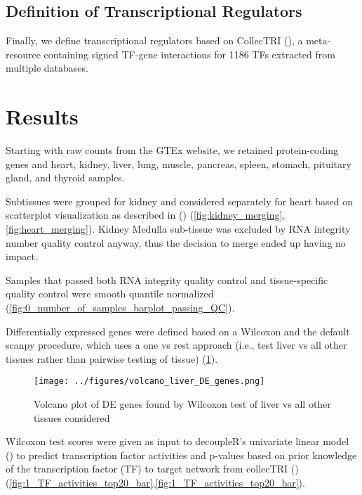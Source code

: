 \documentclass{article}
\begin{document}
\subsection{Definition of Transcriptional Regulators}

Finally, we define transcriptional regulators based on CollecTRI (\cite{Muller-Dott2023-ve}), a meta-resource containing signed TF-gene interactions for 1186 TFs extracted from multiple databases.


\section{Results}

Starting with raw counts from the GTEx website, we retained protein-coding genes and heart, kidney, liver, lung, muscle, pancreas, spleen, stomach, pituitary gland, and thyroid samples.

Subtissues were grouped for kidney and considered separately for heart based on scatterplot visualization as described in (\cite{Paulson2017-jv}) (\ref{fig:kidney_merging}, \ref{fig:heart_merging}). Kidney Medulla sub-tissue was excluded by RNA integrity number quality control anyway, thus the decision to merge ended up having no impact.

Samples that passed both RNA integrity quality control and tissue-specific quality control were smooth quantile normalized (\ref{fig:0_number_of_samples_barplot_passing_QC}).


Differentially expressed genes were defined based on a Wilcoxon and the default scanpy procedure, which uses a one vs rest approach (i.e., test liver vs all other tissues rather than pairwise testing of tissue) (\ref{fig:volcano_liver_DE_genes}). 

\begin{figure}[htbp]
  \centering
  \texttt{[image: ../figures/volcano\_liver\_DE\_genes.png]}
  \caption{Volcano plot of DE genes found by Wilcoxon test of liver vs all other tissues considered}
  \label{fig:volcano_liver_DE_genes}
\end{figure}
\FloatBarrier

Wilcoxon test scores were given as input to decoupleR's univariate linear model (\cite{Badia-I-Mompel2022-wj}) to predict transcription factor activities and p-values based on prior knowledge of the transcription factor (TF) to target network from collecTRI (\cite{Muller-Dott2023-ve}) (\ref{fig:1_TF_activities_top20_bar},\ref{fig:1_TF_activities_top20_bar}).
\end{document}
